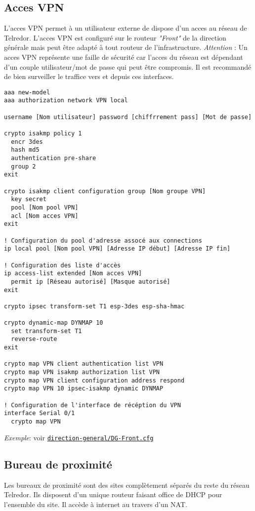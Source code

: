 \documentclass{article}
\newcommand{\tlr}{Telredor\xspace}
\newcommand{\seefile}[1]{
  \begin{center}
  \begin{minipage}{0.9\textwidth}
    \emph{Exemple}: voir \texttt{\href{https://github.com/EpicKiwi/Wide-Network-Project-Cesi-A4/blob/master/network/#1}{#1}}
  \end{minipage}
  \end{center}
}
\begin{document}
\subsection{Acces VPN}

L'acces VPN permet à un utilisateur externe de dispose d'un acces au réseau de \tlr.
L'acces VPN est configuré sur le routeur \emph{"Front"} de la direction générale mais peut être adapté à tout routeur de l'infrastructure.
\emph{Attention} : Un acces VPN représente une faille de sécurité car l'acces du réseau est dépendant d'un couple utilisateur/mot de passe qui peut être compromis.
Il est recommandé de bien surveiller le traffice vers et depuis ces interfaces.

\begin{lstlisting}[caption=Configuration d'un service VPN]
aaa new-model
aaa authorization network VPN local

username [Nom utilisateur] password [chiffrrement pass] [Mot de passe]

crypto isakmp policy 1
  encr 3des
  hash md5
  authentication pre-share
  group 2
exit

crypto isakmp client configuration group [Nom groupe VPN]
  key secret
  pool [Nom pool VPN]
  acl [Nom acces VPN]
exit

! Configuration du pool d'adresse assocé aux connections
ip local pool [Nom pool VPN] [Adresse IP début] [Adresse IP fin]

! Configuration des liste d'accès
ip access-list extended [Nom acces VPN]
  permit ip [Réseau autorisé] [Masque autorisé]
exit

crypto ipsec transform-set T1 esp-3des esp-sha-hmac

crypto dynamic-map DYNMAP 10
  set transform-set T1
  reverse-route
exit

crypto map VPN client authentication list VPN
crypto map VPN isakmp authorization list VPN
crypto map VPN client configuration address respond
crypto map VPN 10 ipsec-isakmp dynamic DYNMAP

! Configuration de l'interface de récéption du VPN
interface Serial 0/1
  crypto map VPN
\end{lstlisting}

\seefile{direction-general/DG-Front.cfg}

\subsection{Bureau de proximité}

Les bureaux de proximité sont des sites complètement séparés du reste du réseau \tlr.
Ils disposent d'un unique routeur faisant office de DHCP pour l'ensemble du site.
Il accède à internet au travers d'un NAT.
\end{document}
